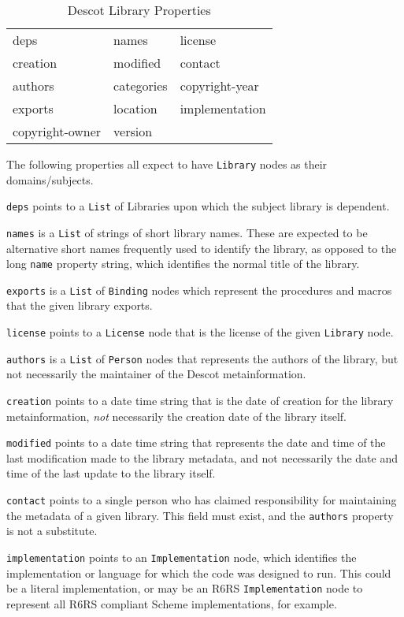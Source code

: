 \documentclass[9pt,cm,twocolumn,preprint]{sigplanconf}
\begin{document}
\begin{table}
\begin{center}
\begin{tabular}{lll}
deps & names & license \\
creation & modified & contact \\
authors & categories & copyright-year \\
exports & location & implementation \\ 
copyright-owner & version & \\
\end{tabular}
\end{center}
\caption{Descot Library Properties}
\label{library_props}
\end{table}

The following properties all expect to have {\tt Library} nodes 
as their domains/subjects. 

{\tt deps} points to a {\tt List} of Libraries upon which the subject 
library is dependent. 

{\tt names} is a {\tt List} of strings of short library names. These 
are expected to be alternative short names frequently used to identify 
the library, as opposed to the long {\tt name} property string, which 
identifies the normal title of the library.

{\tt exports} is a {\tt List} of {\tt Binding} nodes which represent 
the procedures and macros that the given library exports. 

{\tt license} points to a {\tt License} node that is the license of 
the given {\tt Library} node. 

{\tt authors} is a {\tt List} of {\tt Person} nodes that represents 
the authors of the library, but not necessarily the maintainer of 
the Descot metainformation.

{\tt creation} points to a date time string that is the date 
of creation for the library metainformation, {\it not} necessarily 
the creation date of the library itself. 

{\tt modified} points to a date time string that represents the 
date and time of the last modification made to the library metadata, 
and not necessarily the date and time of the last update to the 
library itself. 

{\tt contact} points to a single person who has claimed responsibility 
for maintaining the metadata of a given library. This field must 
exist, and the {\tt authors} property is not a substitute. 

{\tt implementation} points to an {\tt Implementation} node, which 
identifies the implementation or language for which the code was 
designed to run. This could be a literal implementation, or may be 
an R6RS {\tt Implementation} node to represent all R6RS compliant 
Scheme implementations, for example. 
\end{document}
